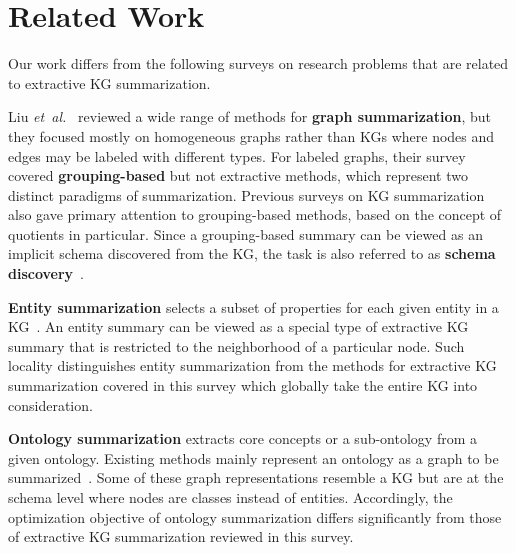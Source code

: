 \section{Related Work}
\label{sec:rw}

Our work differs from the following surveys on research problems that are related to extractive KG summarization.

Liu \emph{et~al.}~ reviewed a wide range of methods for \textbf{graph summarization}, but they focused mostly on homogeneous graphs rather than KGs where nodes and edges may be labeled with different types. For labeled graphs, their survey covered \textbf{grouping-based} but not extractive methods, which represent two distinct paradigms of summarization. Previous surveys on KG summarization~\cite{DBLP:journals/vldb/CebiricGKKMTZ19,DBLP:journals/tgdk/ScherpRBCR23} also gave primary attention to grouping-based methods, based on the concept of quotients in particular. Since a grouping-based summary can be viewed as an implicit schema discovered from the KG, the task is also referred to as \textbf{schema discovery}~\cite{DBLP:journals/vldb/Kellou-MenouerK22}.

\textbf{Entity summarization} selects a subset of properties for each given entity in a KG~\cite{DBLP:journals/ws/LiuCGQ21}. An entity summary can be viewed as a special type of extractive KG summary that is restricted to the neighborhood of a particular node. Such locality distinguishes entity summarization from the methods for extractive KG summarization covered in this survey which globally take the entire KG into consideration.

\textbf{Ontology summarization} extracts core concepts or a sub-ontology from a given ontology. Existing methods mainly represent an ontology as a graph to be summarized~\cite{DBLP:journals/ijsc/PouriyehALCAAMK19}. Some of these graph representations resemble a KG but are at the schema level where nodes are classes instead of entities. Accordingly, the optimization objective of ontology summarization differs significantly from those of extractive KG summarization reviewed in this survey.